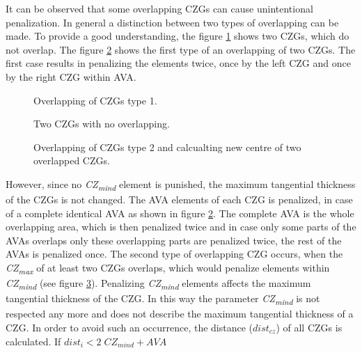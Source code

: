 It can be observed that some overlapping CZGs can
cause unintentional penalization.
In general a distinction between two types of 
overlapping can be made. To provide a good understanding, the figure \ref{fig_CZG_overlapping_1}
  shows two CZGs, which do not overlap. 
  The figure \ref{fig_CZG_overlapping_2} shows the first type
  of an overlapping of two CZGs. The first case results in penalizing the elements twice, once by the
left CZG and once by the right CZG within AVA.
\vspace{0.2cm}
 \begin{figure} [!h]
 \def\svgwidth{\textwidth}
 
 \caption{Overlapping of CZGs type 1.}    %
 \label{fig_CZG_overlapping_1}          %
\end{figure} 
%
 \begin{figure} [!h]
 \centering
 \def\svgwidth{\textwidth}
 
 \caption{Two CZGs with no overlapping.}    %
 \label{fig_CZG_overlapping_2}          %
\end{figure} 
 \begin{figure} [!h]
 \centering
 \def\svgwidth{\textwidth}
 
 \caption{Overlapping of CZGs type 2 and calcualting new centre of two overlapped CZGs.}    %
 \label{fig_CZG_overlapping_3}          %
\end{figure} 
However, since no \textit{CZ\textsubscript{mind}} element is punished,
 the maximum tangential thickness of the CZGs
is not changed. The AVA elements of each CZG is 
penalized, in case of a complete identical AVA
as shown in figure \ref{fig_CZG_overlapping_2}.
The complete AVA
is the whole overlapping area, which is then penalized twice
and in case only some parts of the AVAs overlaps 
only these overlapping parts are penalized twice,
the rest of the AVAs is penalized once.
The second type of overlapping CZG occurs, when the \textit{CZ\textsubscript{max}} of at least two CZGs overlaps,
which would penalize elements within \textit{CZ\textsubscript{mind}} (see figure \ref{fig_CZG_overlapping_3}). Penalizing \textit{CZ\textsubscript{mind}} elements affects
the maximum tangential thickness of the CZG. In this way the parameter \textit{CZ\textsubscript{mind}} is not respected
any more and does not describe the maximum tangential thickness of a CZG. In order to avoid
such an occurrence, the distance ($dist_{cz}$) of all CZGs is calculated. If
$dist_i < 2 \; CZ_{mind} +AVA $
